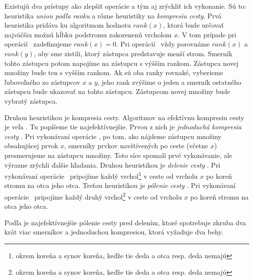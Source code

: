 Existujú dva prístupy ako zlepšiť operácie a tým aj zrýchliť ich vykonanie. 
Sú to: heuristika \emph{union podľa ranku} a rôzne heuristiky na 
\emph{kompresiu cesty}. Prvá heuristika pridáva ku algoritmom hodnotu 
$rank(x)$, ktorá bude určovať najväčšiu možnú hĺbku podstromu zakorenenú 
vrcholom $x$. V tom prípade pri o\-pe\-rá\-cií \makeset\ zadefinujeme 
$rank(x) = 0$. 
Pri o\-pe\-rá\-cií \union\ vždy porovnáme $rank(x)$ a $rank(y)$, aby sme zistili, 
ktorý zástupca predstavuje menší strom. Smerník tohto zástupcu potom napojíme 
na zástupcu s výšším rankom. Zástupca novej množiny bude ten s vyšším rankom. 
Ak sú oba ranky rovnaké, vyberieme ľubovoľného zo zástupcov $x$ a $y$, 
jeho rank zvýšime o jeden a smerník ostatného zástupcu bude ukazovať 
na tohto zástupcu. Zástupcom novej množiny bude vybratý zástupca. 

Druhou heuristikou je kompresia cesty. Algoritmov na efektívnu kompresiu 
cesty je veľa \citep{paths2}. Tu popíšeme tie najefektívnejšie. Prvou z nich 
je \emph{jednoduchá kompresia cesty} \citep{comp1}. Pri vykonávaní 
operácie \find, po tom, 
ako nájdeme zástupcu množiny obsahujúcej prvok $x$, smerníky prvkov 
navštívených po ceste (včetne $x$) presmerujeme na zástupcu množiny. Toto 
síce spomalí prvé vykonávanie, ale výrazne zrýchli ďalšie hľadania. 
Druhou heuristikou je \emph{delenie cesty} \citep{comp2}. Pri vykonávaní 
operácie \find\ 
pripojíme každý vrchol\footnote{okrem koreňa a synov koreňa, 
keďže tie deda a otca resp. deda nemajú} v ceste od vrcholu $x$ po koreň stromu 
na otca jeho otca. 
Treťou heuristikou je \emph{pólenie cesty} \citep{comp2}. Pri vykonávaní 
operácie \find\ 
pripojíme každý druhý vrchol\footnote{okrem koreňa a synov koreňa, 
keďže tie deda a otca resp. deda nemajú} 
v ceste od vrcholu $x$ po koreň stromu na otca jeho otca. 

Podľa \citet{galil} je najefektívnejšie pólenie cesty pred delením, ktoré 
spotrebuje zhruba dva krát viac smerníkov a jednoduchou kompresiou, ktorá 
vyžaduje dva behy.


